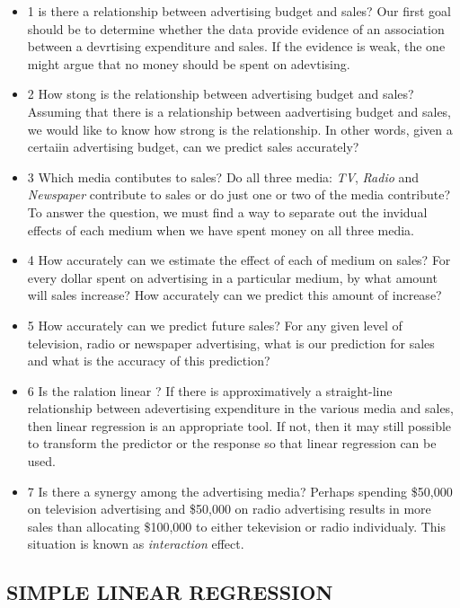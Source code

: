 \documentclass[
]{article}
\begin{document}
\begin{itemize}
\item
  1 is there a relationship between advertising budget and sales? Our
  first goal should be to determine whether the data provide evidence of
  an association between a devrtising expenditure and sales. If the
  evidence is weak, the one might argue that no money should be spent on
  adevtising.\\
\item
  2 How stong is the relationship between advertising budget and sales?
  Assuming that there is a relationship between aadvertising budget and
  sales, we would like to know how strong is the relationship. In other
  words, given a certaiin advertising budget, can we predict sales
  accurately?
\item
  3 Which media contibutes to sales? Do all three media: \emph{TV},
  \emph{Radio} and \emph{Newspaper} contribute to sales or do just one
  or two of the media contribute? To answer the question, we must find a
  way to separate out the invidual effects of each medium when we have
  spent money on all three media.
\item
  4 How accurately can we estimate the effect of each of medium on
  sales? For every dollar spent on advertising in a particular medium,
  by what amount will sales increase? How accurately can we predict this
  amount of increase?
\item
  5 How accurately can we predict future sales? For any given level of
  television, radio or newspaper advertising, what is our prediction for
  sales and what is the accuracy of this prediction?
\item
  6 Is the ralation linear ? If there is approximatively a straight-line
  relationship between adevertising expenditure in the various media and
  sales, then linear regression is an appropriate tool. If not, then it
  may still possible to transform the predictor or the response so that
  linear regression can be used.
\item
  7 Is there a synergy among the advertising media? Perhaps spending
  \$50,000 on television advertising and \$50,000 on radio advertising
  results in more sales than allocating \$100,000 to either tekevision
  or radio individualy. This situation is known as \emph{interaction}
  effect.
\end{itemize}

\hypertarget{simple-linear-regression}{%
\subsection{SIMPLE LINEAR REGRESSION}\label{simple-linear-regression}}
\end{document}
